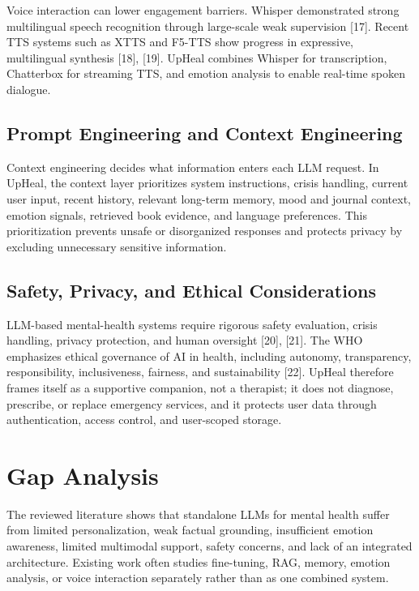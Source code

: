 \documentclass[
  letterpaper,
  12pt,
  a4paper,
  openany]{report}
\begin{document}
Voice interaction can lower engagement barriers. Whisper demonstrated
strong multilingual speech recognition through large-scale weak
supervision {[}17{]}. Recent TTS systems such as XTTS and F5-TTS show
progress in expressive, multilingual synthesis {[}18{]}, {[}19{]}.
UpHeal combines Whisper for transcription, Chatterbox for streaming TTS,
and emotion analysis to enable real-time spoken dialogue.

\subsection{Prompt Engineering and Context
Engineering}\label{prompt-engineering-and-context-engineering}

Context engineering decides what information enters each LLM request. In
UpHeal, the context layer prioritizes system instructions, crisis
handling, current user input, recent history, relevant long-term memory,
mood and journal context, emotion signals, retrieved book evidence, and
language preferences. This prioritization prevents unsafe or
disorganized responses and protects privacy by excluding unnecessary
sensitive information.

\subsection{Safety, Privacy, and Ethical
Considerations}\label{safety-privacy-and-ethical-considerations}

LLM-based mental-health systems require rigorous safety evaluation,
crisis handling, privacy protection, and human oversight {[}20{]},
{[}21{]}. The WHO emphasizes ethical governance of AI in health,
including autonomy, transparency, responsibility, inclusiveness,
fairness, and sustainability {[}22{]}. UpHeal therefore frames itself as
a supportive companion, not a therapist; it does not diagnose,
prescribe, or replace emergency services, and it protects user data
through authentication, access control, and user-scoped storage.

\section{Gap Analysis}\label{sec-gap}

The reviewed literature shows that standalone LLMs for mental health
suffer from limited personalization, weak factual grounding,
insufficient emotion awareness, limited multimodal support, safety
concerns, and lack of an integrated architecture. Existing work often
studies fine-tuning, RAG, memory, emotion analysis, or voice interaction
separately rather than as one combined system.
\end{document}
